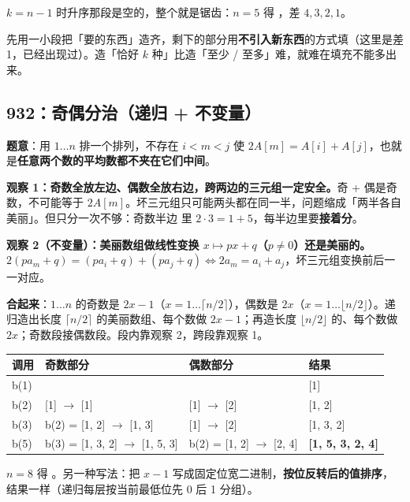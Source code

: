$k = n-1$ 时升序那段是空的，整个就是锯齿：$n=5$ 得 \code{[1,5,2,4,3]}，差 $4,3,2,1$。

\begin{principle}
先用一小段把「要的东西」造齐，剩下的部分用\textbf{不引入新东西}的方式填（这里是差 1，已经出现过）。造「恰好 $k$ 种」比造「至少 / 至多」难，就难在填充不能多出来。
\end{principle}

\subsection{932：奇偶分治（递归 + 不变量）}

\textbf{题意}：用 $1 \dots n$ 排一个排列，不存在 $i < m < j$ 使 $2A[m] = A[i] + A[j]$，也就是\textbf{任意两个数的平均数都不夹在它们中间}。

\textbf{观察 1：奇数全放左边、偶数全放右边，跨两边的三元组一定安全。}奇 + 偶是奇数，不可能等于 $2A[m]$。坏三元组只可能两头都在同一半，问题缩成「两半各自美丽」。但只分一次不够：奇数半边  里 $2 \cdot 3 = 1 + 5$，每半边里要\textbf{接着分}。

\textbf{观察 2（不变量）：美丽数组做线性变换 $x \mapsto px + q$（$p \ne 0$）还是美丽的。}
$2(pa_m + q) = (pa_i + q) + (pa_j + q) \iff 2a_m = a_i + a_j$，坏三元组变换前后一一对应。

\textbf{合起来}：$1 \dots n$ 的奇数是 $2x-1$（$x = 1 \dots \lceil n/2 \rceil$），偶数是 $2x$（$x = 1 \dots \lfloor n/2 \rfloor$）。递归造出长度 $\lceil n/2 \rceil$ 的美丽数组、每个数做 $2x-1$；再造长度 $\lfloor n/2 \rfloor$ 的、每个数做 $2x$；奇数段接偶数段。段内靠观察 2，跨段靠观察 1。

\begin{center}\small
\begin{tabular}{@{}l l l l@{}}
\toprule
\textbf{调用} & \textbf{奇数部分} & \textbf{偶数部分} & \textbf{结果}\\
\midrule
b(1) & & & [1]\\
b(2) & [1] $\to$ [1] & [1] $\to$ [2] & [1, 2]\\
b(3) & b(2) = [1, 2] $\to$ [1, 3] & [1] $\to$ [2] & [1, 3, 2]\\
b(5) & b(3) = [1, 3, 2] $\to$ [1, 5, 3] & b(2) = [1, 2] $\to$ [2, 4] & \textbf{[1, 5, 3, 2, 4]}\\
\bottomrule
\end{tabular}
\end{center}

$n=8$ 得 \code{[1,5,3,7,2,6,4,8]}。另一种写法：把 $x-1$ 写成固定位宽二进制，\textbf{按位反转后的值排序}，结果一样（递归每层按当前最低位先 0 后 1 分组）。

